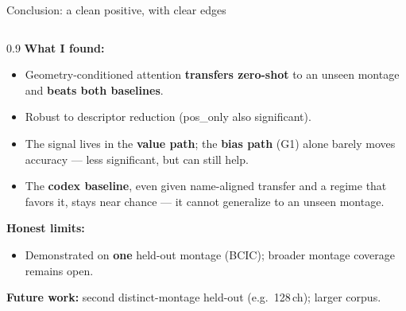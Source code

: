 \documentclass[aspectratio=169]{beamer}
\begin{document}
\begin{frame}{Conclusion: a clean positive, with clear edges}
  \begin{columns}[T]
    \begin{column}{0.9\textwidth}
      \small
      \textbf{What I found:}
      \begin{itemize}
        \setlength{\itemsep}{3pt}
        \item Geometry-conditioned attention \textbf{transfers zero-shot} to an unseen montage and \textbf{beats both baselines}.
        \item Robust to descriptor reduction (pos\_only also significant).
        \item The signal lives in the \textcolor{valuepathcol}{\textbf{value path}}; the \textcolor{biaspathcol}{\textbf{bias path}} (G1) alone barely moves accuracy --- less significant, but can still help.
        \item The \textcolor{codexcolor}{\textbf{codex baseline}}, even given name-aligned transfer and a regime that favors it, stays near chance --- it cannot generalize to an unseen montage.
      \end{itemize}
      \vspace{0.5em}
      \textbf{Honest limits:}
      \begin{itemize}
        \setlength{\itemsep}{3pt}
        \item Demonstrated on \textbf{one} held-out montage (BCIC); broader montage coverage remains open.
      \end{itemize}
      \vspace{0.5em}
      \textbf{Future work:} second distinct-montage held-out (e.g.\ 128\,ch); larger corpus.
    \end{column}
  \end{columns}
\end{frame}
\end{document}

